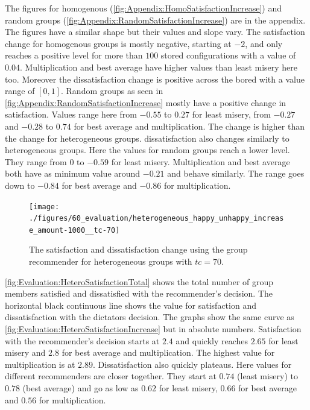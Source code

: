 The figures for homogenous (\autoref{fig:Appendix:HomoSatisfactionIncrease}) and random groups (\autoref{fig:Appendix:RandomSatisfactionIncrease}) are in the appendix. The figures have a similar shape but their values and slope vary. The satisfaction change for homogenous groups is mostly negative, starting at $-2$, and only reaches a positive level for more than $100$ stored configurations with a value of $0.04$. Multiplication and best average have higher values than least misery here too. Moreover the dissatisfaction change is positive across the bored with a value range of $[0,1]$.
Random groups as seen in \autoref{fig:Appendix:RandomSatisfactionIncrease} mostly have a positive change in satisfaction. Values range here from $-0.55$ to $0.27$ for least misery, from $-0.27$ and $-0.28$ to $0.74$ for best average and multiplication. The change is higher than the change for heterogeneous groups. dissatisfaction also changes similarly to heterogeneous groups. Here the values for random groups reach a lower level. They range from $0$ to $-0.59$ for least misery. Multiplication and best average both have as minimum value around $-0.21$ and behave similarly. The range goes down to $-0.84$ for best average and $-0.86$ for multiplication.

\begin{figure}
    \centering
    \texttt{[image: ./figures/60\_evaluation/heterogeneous\_happy\_unhappy\_increase\_amount-1000\_\_tc-70]}
    \caption{The satisfaction and dissatisfaction change using the group recommender for heterogeneous groups with $tc = 70$.}
    \label{fig:Evaluation:HeteroSatisfactionIncrease}
\end{figure}

\autoref{fig:Evaluation:HeteroSatisfactionTotal} shows the total number of group members satisfied and dissatisfied with the recommender's decision. The horizontal black continuous line shows the value for satisfaction and dissatisfaction with the dictators decision. The graphs show the same curve as \autoref{fig:Evaluation:HeteroSatisfactionIncrease} but in absolute numbers. Satisfaction with the recommender's decision starts at $2.4$ and quickly reaches $2.65$ for least misery and $2.8$ for best average and multiplication. The highest value for multiplication is at $2.89$. Dissatisfaction also  quickly plateaus. Here values for different recommenders are closer together. They start at $0.74$ (least misery) to $0.78$ (best average) and go as low as $0.62$ for least misery, $0.66$ for best average and $0.56$ for multiplication.

